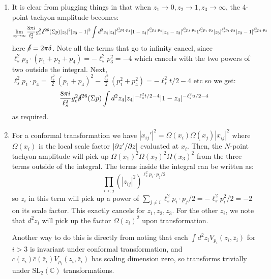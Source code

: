 \documentclass[11pt, class=article, crop=false]{standalone}
\begin{document}
\begin{enumerate}
 As stated before, the correlator when viewed in the complex plane will be a homogenous rational function of degree exactly $3-n$. That way, it will be finite at infinity. We also know that this function is antisymmetric upon swapping any of the $z_i$, any of the $w_i$, or any of the $z_i$ with the $w_i$. Further, if any of the $z_i = z_j$ or $w_i = w_j$, this function will vanish. On the other hand, if $z_i = w_j$, we expect a contribution of a pole $\frac1{z_i-w_j}$. There is only one such homogenous rational function:
 	\[
 		\frac{\prod_{i < j}^{n+3} (z_i - z_j) \prod_{i<j}^{n} (w_i - w_j)}{\prod_{i=1}^{n+3} \prod_{j=1}^n (z_i - w_j)}.
 	\]
 	This is indeed of degree $3-n$, as desired.
	
	\item It is clear from plugging things in that when $z_1 \to 0, z_2 \to 1, z_3 \to \infty$, the 4-point tachyon amplitude becomes:
	\[
		\lim_{z_3 \to \infty} \frac{8 \pi i}{\ell_s^2} g_c^2\,  \cancel\delta^{26}(\Sigma p) |z_3|^2 |z_3-1|^2 \int d^2 z_4 |z_4|^{\ell_s^2 p_1 \cdot p_4} |1-z_4|^{\ell_s^2 p_2 \cdot p_4} |z_4 - z_3|^{\ell_s^2 p_3 \cdot p_4} 1^{\ell_s^2 p_1 \cdot p_2}|z_3|^{\ell_s^2 p_1 \cdot p_3} |z_3 - 1|^{\ell_s^2 p_2 \cdot p_3} 
	\]
	here $\cancel\delta = 2 \pi \delta$. 
	Note all the terms that go to infinity cancel, since $\ell_s^2 p_3 \cdot (p_1 + p_2 + p_4) = -\ell_s^2 p_3^2 = -4$ which cancels with the two powers of two outside the integral. Next, $\ell_s^2 p_1 \cdot p_4 = \frac{\ell_s^2}{2} (p_1 + p_4)^2 - \frac{\ell_s^2}{2}(p_1^2 + p_4^2) = -\ell_s^2 t/2 - 4$ etc so we get:
	\[
		\frac{8 \pi i}{\ell_s^2} g_c^2 \cancel\delta^{26}(\Sigma p) \int d^2 z_4 |z_4|^{-\ell_s^2 t/2- 4} |1-z_4|^{-\ell_s^2 u/2 - 4} 
	\]
	as required. 
	
	\item For a conformal transformation we have $|x_{ij}'|^2 = \Omega(x_i) \Omega(x_j) |x_{ij}|^2$ where $\Omega(x_i)$ is the local scale factor $|\partial z'/\partial z|$ evaluated at $x_i$. Then, the $N$-point tachyon amplitude will pick up $\Omega(x_1)^2 \Omega(x_2)^2 \Omega(x_3)^2$ from the three terms outside of the integral. The terms inside the integral can be written as:
	\[
		\prod_{i < j} (|z_{ij}|^2)^{\ell_s^2 p_i \cdot p_j/2}
	\]
	so $z_i$ in this term will pick up a power of $\sum_{j \neq i} \ell_s^2 p_i \cdot p_j/2 = -\ell_s^2 p_i^2 / 2 = -2$ on its scale factor. This exactly cancels for $z_1, z_2, z_3$. For the other $z_i$, we note that $d^2 z_i$ will pick up the factor $\Omega(z_i)^{2}$ upon transformation. 
	
	Another way to do this is directly from noting that each $\int d^2 z_i V_{p_i} (z_i, \bar z_i)$ for $i > 3$ is invariant under conformal transformation, and $c(z_i) \bar c(\bar z_i) V_{p_i}(z_i, \bar z_i)$ has scaling dimension zero, so transforms trivially under $\mathrm{SL}_2 (\mathbb C)$ transformations. 
	

\end{enumerate}
\end{document}
